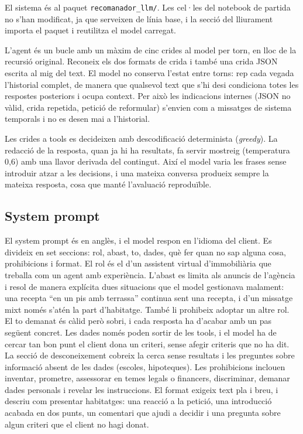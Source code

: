 \documentclass[10pt,a4paper]{article}
\begin{document}
El sistema és al paquet \texttt{recomanador\_llm/}. Les cel·les del notebook de partida no s'han modificat, ja que serveixen de línia base, i la secció del lliurament importa el paquet i reutilitza el model carregat.

L'agent és un bucle amb un màxim de cinc crides al model per torn, en lloc de la recursió original. Reconeix els dos formats de crida i també una crida JSON escrita al mig del text. El model no conserva l'estat entre torns: rep cada vegada l'historial complet, de manera que qualsevol text que s'hi desi condiciona totes les respostes posteriors i ocupa context. Per això les indicacions internes (JSON no vàlid, crida repetida, petició de reformular) s'envien com a missatges de sistema temporals i no es desen mai a l'historial.

Les crides a tools es decideixen amb descodificació determinista (\emph{greedy}). La redacció de la resposta, quan ja hi ha resultats, fa servir mostreig (temperatura 0,6) amb una llavor derivada del contingut. Així el model varia les frases sense introduir atzar a les decisions, i una mateixa conversa produeix sempre la mateixa resposta, cosa que manté l'avaluació reproduïble.

\subsection{System prompt}

El system prompt és en anglès, i el model respon en l'idioma del client. Es divideix en set seccions: rol, abast, to, dades, què fer quan no sap alguna cosa, prohibicions i format. El rol és el d'un assistent virtual d'immobiliària que treballa com un agent amb experiència. L'abast es limita als anuncis de l'agència i resol de manera explícita dues situacions que el model gestionava malament: una recepta ``en un pis amb terrassa'' continua sent una recepta, i d'un missatge mixt només s'atén la part d'habitatge. També li prohibeix adoptar un altre rol. El to demanat és càlid però sobri, i cada resposta ha d'acabar amb un pas següent concret. Les dades només poden sortir de les tools, i el model ha de cercar tan bon punt el client dona un criteri, sense afegir criteris que no ha dit. La secció de desconeixement cobreix la cerca sense resultats i les preguntes sobre informació absent de les dades (escoles, hipoteques). Les prohibicions inclouen inventar, prometre, assessorar en temes legals o financers, discriminar, demanar dades personals i revelar les instruccions. El format exigeix text pla i breu, i descriu com presentar habitatges: una reacció a la petició, una introducció acabada en dos punts, un comentari que ajudi a decidir i una pregunta sobre algun criteri que el client no hagi donat.
\end{document}
